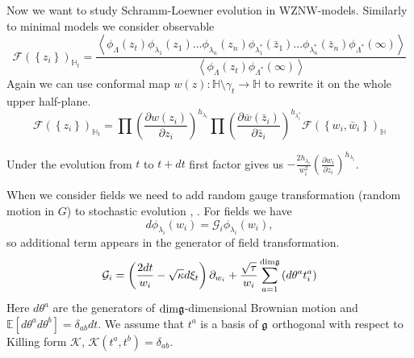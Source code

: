 Now we want to study Schramm-Loewner evolution in WZNW-models.
Similarly to minimal models we consider observable
\begin{equation*}
  \mathcal{F}(\left\{z_{i}\right\})_{\mathbb{H}_{t}}=
  \frac{\left<\phi_{\Lambda}(z_{t}) \phi_{\lambda_1}(z_{1}) \dots \phi_{\lambda_n}(z_{n}) \phi_{\lambda^{*}_1}(\bar z_{1}) \dots \phi_{\lambda^{*}_n}(\bar z_{n})
      \phi_{\Lambda^{*}}(\infty)\right>}{\left<\phi_{\Lambda}(z_{t})\phi_{\Lambda^{*}}(\infty)\right>}
\end{equation*}
Again we can use conformal map  $w(z):\mathbb{H}\setminus\gamma_{t}\to \mathbb{H}$ to rewrite it on the whole upper half-plane. 
\begin{equation*}
  \mathcal{F}(\left\{z_{i}\right\})_{\mathbb{H}_{t}}=\prod \left(\frac{\partial w(z_{i})}{\partial z_{i}}\right)^{h_{\lambda_i}} 
  \prod \left(\frac{\partial \bar w(\bar z_{i})}{\partial \bar z_{i}}\right)^{h_{\lambda^{*}_i}}
  \mathcal{F}(\left\{w_{i}, \bar w_{i}\right\})_{\mathbb{H}}
\end{equation*}

Under the evolution from $t$ to $t+dt$ first factor gives us $-\frac{2h_{\lambda_{i}}}{w_{i}^{2}}\left(\frac{\partial w_{i}}{\partial z_{i}}\right)^{h_{\lambda_{i}}}$.

When we consider fields we need to add random gauge transformation (random motion in $G$) to stochastic evolution \cite{bettelheim2005stochastic}, \cite{alekseev2010sle}. 
For fields we have
\begin{equation*}
  d\phi_{\lambda_{i}}(w_{i}) = \mathcal{G}_{i}\phi_{\lambda_{i}}(w_{i}),
\end{equation*}
so additional term appears in the generator of field transformation. 
\begin{equation}
  \mathcal{G}_{i}=\left(\frac{2dt}{w_{i}}-\sqrt{\kappa} d\xi_{t}\right) \partial_{w_{i}}+\frac{\sqrt{\tau}}{w_{i}}\sum_{a=1}^{\mathrm{dim} \mathfrak{g}}\left(d \theta ^{a} t^{a}_{i}\right)
\label{eq:18}
\end{equation}
Here $d\theta^{a}$ are the generators of $\mathrm{dim}\mathfrak{g}$-dimensional Brownian motion and $\mathbb{E}[d\theta^{a}d\theta^{b}]=\delta_{ab}dt$. We assume that $t^{a}$ is a basis of $\mathfrak{g}$ orthogonal with respect to Killing form $\mathcal{K}$, $\mathcal{K}(t^{a},t^{b})=\delta_{ab}$.

